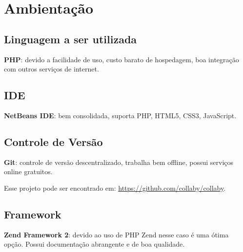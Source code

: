 \section{Ambientação}

\subsection{Linguagem a ser utilizada}

\textbf{PHP}: devido a facilidade de uso, custo barato de hospedagem,
boa integração com outros serviços de internet.

\subsection{IDE}

\textbf{NetBeans IDE}: bem consolidada, suporta PHP, HTML5, CSS3,
JavaScript.

\subsection{Controle de Versão}

\textbf{Git}: controle de versão descentralizado, trabalha bem offline,
possui serviços online gratuitos.

Esse projeto pode ser encontrado em:
\url{https://github.com/collaby/collaby}.

\subsection{Framework}

\textbf{Zend Framework 2}: devido ao uso de PHP Zend nesse caso é uma
ótima opção. Possui documentação abrangente e de boa qualidade.
